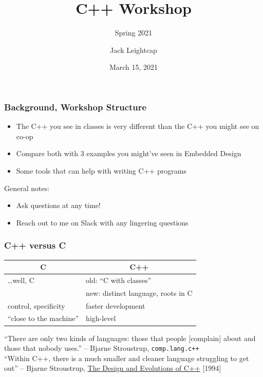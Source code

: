 \documentclass{beamer} \usetheme{Madrid}
\title{C++ Workshop}
\subtitle{Spring 2021}
\author[]{Jack Leightcap\inst{1}\inst{2}}
\institute[IEEE, Wireless Club]{
	\inst{1}IEEE -- \url{nuieeeofficers@gmail.com}
	\and
	\inst{2}Wireless Club -- \url{nuwirelessclub@gmail.com}
}
\date[Spring 2021]{March 15, 2021}
\begin{document}
\frame{\titlepage}

\begin{frame}
	\frametitle{Background, Workshop Structure}
	\begin{itemize}
		\item The C++ you see in classes is very different than the C++ you might see on co-op
		\item Compare both with 3 examples you might've seen in Embedded Design
		\item Some tools that can help with writing C++ programs
	\end{itemize}
	\vfill
	General notes:
	\begin{itemize}
		\item Ask questions at any time!
		\item Reach out to me on Slack with any lingering questions
	\end{itemize}
\end{frame}

\begin{frame}
	\frametitle{C++ versus C}
	\vfill
	\begin{table}[]
		\begin{tabular}{l|l}
			\multicolumn{1}{c|}{\textbf{C}} & \multicolumn{1}{c}{\textbf{C++}}   \\
			\hline
			\ldots well, C                  & old: ``C with classes''            \\
			                                & new: distinct language, roots in C \\
			control, specificity            & faster development                 \\
			``close to the machine''        & high-level
		\end{tabular}
	\end{table}
	\begin{center}
	\end{center}
	\vfill
	``There are only two kinds of languages: those that people [complain] about and those that nobody uses.'' -- Bjarne Stroustrup, \texttt{comp.lang.c++}\\[1em]
	``Within C++, there is a much smaller and cleaner language struggling to get out'' -- Bjarne Stroustrup, \underline{The Design and Evolutions of C++} [1994]
	\vfill
\end{frame}
\end{document}
